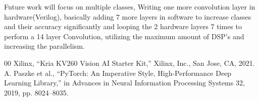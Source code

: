 \documentclass[conference]{IEEEtran}
\begin{document}
Future work will focus on multiple classes, Writing one more convolution layer in hardware(Verilog), basically adding 7 more layers in software to increase classes and their accuracy significantly and looping the 2 hardware layers 7 times to perform a 14 layer Convolution, utilizing the maximum amount of DSP's and increasing the parallelism.

\begin{thebibliography}{00}
 Xilinx, ``Kria KV260 Vision AI Starter Kit,'' Xilinx, Inc., San Jose, CA, 2021.
 A. Paszke et al., ``PyTorch: An Imperative Style, High-Performance Deep Learning Library,'' in Advances in Neural Information Processing Systems 32, 2019, pp. 8024--8035.
\end{thebibliography}
\end{document}
